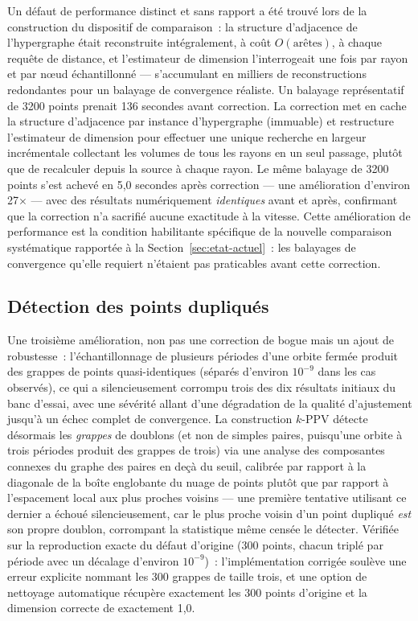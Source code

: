 \documentclass[11pt,a4paper]{article}
\begin{document}
Un défaut de performance distinct et sans rapport a été trouvé lors de la
construction du dispositif de comparaison~: la structure d'adjacence de
l'hypergraphe était reconstruite intégralement, à coût $O(\text{arêtes})$,
à chaque requête de distance, et l'estimateur de dimension l'interrogeait
une fois par rayon et par nœud échantillonné --- s'accumulant en milliers
de reconstructions redondantes pour un balayage de convergence réaliste.
Un balayage représentatif de 3200 points prenait 136 secondes avant
correction. La correction met en cache la structure d'adjacence par
instance d'hypergraphe (immuable) et restructure l'estimateur de dimension
pour effectuer une unique recherche en largeur incrémentale collectant les
volumes de tous les rayons en un seul passage, plutôt que de recalculer
depuis la source à chaque rayon. Le même balayage de 3200 points s'est
achevé en 5,0 secondes après correction --- une amélioration d'environ
27$\times$ --- avec des résultats numériquement \emph{identiques} avant et
après, confirmant que la correction n'a sacrifié aucune exactitude à la
vitesse. Cette amélioration de performance est la condition habilitante
spécifique de la nouvelle comparaison systématique rapportée à la
Section~\ref{sec:etat-actuel}~: les balayages de convergence qu'elle
requiert n'étaient pas praticables avant cette correction.

\subsection{Détection des points dupliqués}

Une troisième amélioration, non pas une correction de bogue mais un ajout
de robustesse~: l'échantillonnage de plusieurs périodes d'une orbite
fermée produit des grappes de points quasi-identiques (séparés
d'environ $10^{-9}$ dans les cas observés), ce qui a silencieusement
corrompu trois des dix résultats initiaux du banc d'essai, avec une
sévérité allant d'une dégradation de la qualité d'ajustement jusqu'à un
échec complet de convergence. La construction $k$-PPV détecte désormais
les \emph{grappes} de doublons (et non de simples paires, puisqu'une
orbite à trois périodes produit des grappes de trois) via une analyse des
composantes connexes du graphe des paires en deçà du seuil, calibrée par
rapport à la diagonale de la boîte englobante du nuage de points plutôt
que par rapport à l'espacement local aux plus proches voisins --- une
première tentative utilisant ce dernier a échoué silencieusement, car le
plus proche voisin d'un point dupliqué \emph{est} son propre doublon,
corrompant la statistique même censée le détecter. Vérifiée sur la
reproduction exacte du défaut d'origine (300 points, chacun triplé par
période avec un décalage d'environ $10^{-9}$)~: l'implémentation corrigée
soulève une erreur explicite nommant les 300 grappes de taille trois, et
une option de nettoyage automatique récupère exactement les 300 points
d'origine et la dimension correcte de exactement 1,0.
\end{document}
